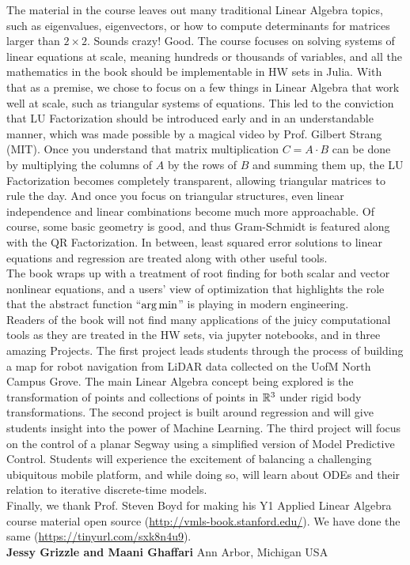 The material in the course leaves out many traditional Linear Algebra topics, such as eigenvalues, eigenvectors, or how to compute determinants for matrices larger than $2 \times 2$. Sounds crazy! Good. The course focuses on solving systems of linear equations at scale, meaning hundreds or thousands of variables, and all the mathematics in the book should be implementable in HW sets in Julia. With that as a premise, we chose to focus on a few things in Linear Algebra that work well at scale, such as triangular systems of equations. This led to the conviction that LU Factorization should be introduced early and in an understandable manner, which was made possible by a magical video by Prof. Gilbert Strang (MIT). Once you understand that matrix multiplication $C= A \cdot B$ can be done by multiplying the columns of $A$ by the rows of $B$ and summing them up, the LU Factorization becomes completely transparent, allowing triangular matrices to rule the day. And once you focus on triangular structures, even linear independence and linear combinations become much more approachable. Of course, some basic geometry is good, and thus Gram-Schmidt is featured along with the QR Factorization. In between, least squared error solutions to linear equations and regression are treated along with other useful tools.\\

The book wraps up with a treatment of root finding for both scalar and vector nonlinear equations, and a users' view of optimization that highlights the role that the abstract function ``$\operatorname*{arg\,min}$'' is playing in modern engineering. \\

Readers of the book will not find many applications of the juicy computational tools as they are treated in the HW sets, via jupyter notebooks, and in three amazing Projects. The first project leads students through the process of building a map for robot navigation from LiDAR data collected on the UofM North Campus Grove. The main Linear Algebra concept being explored is the transformation of points and collections of points in $\mathbb R^3$ under rigid body transformations. The second project is built around regression and will give students insight into the power of Machine Learning. The third project will focus on the control of a planar Segway using a simplified version of Model Predictive Control. Students will experience the excitement of balancing a challenging ubiquitous mobile platform, and while doing so, will learn about ODEs and their relation to iterative discrete-time models. \\

Finally, we thank Prof. Steven Boyd for making his Y1 Applied Linear Algebra course material open source (\url{http://vmls-book.stanford.edu/}). We have done the same (\url{https://tinyurl.com/sxk8n4u9}).\\

\textbf{Jessy Grizzle and Maani Ghaffari}
Ann Arbor, Michigan USA